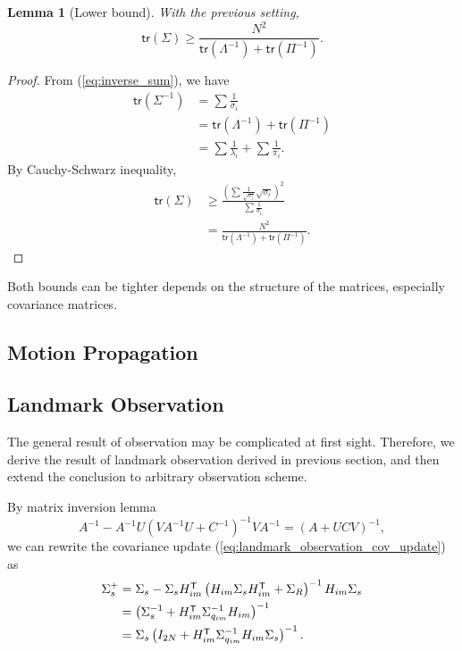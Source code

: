\documentclass[xcolor=x11names]{article}
\DeclareMathOperator\T{\mathsf{T}}
\newtheorem{lemma}{Lemma}
\begin{document}
   \begin{lemma}[Lower bound]
   With the previous setting, 
   \begin{equation}
      \mathsf{tr}(\Sigma) \geq \frac{N^2}{\mathsf{tr}(\Lambda^{-1})  +\mathsf{tr}(\Pi^{-1}) }.
   \end{equation}
   \end{lemma}
   \begin{proof}
   From (\ref{eq:inverse_sum}), we have
   \begin{align*}
       \mathsf{tr}(\Sigma^{-1})
         &=  \sum\frac{1}{\sigma_i}\\
         &= \mathsf{tr}(\Lambda^{-1}) + \mathsf{tr}(\Pi^{-1})  \\ 
         &= \sum\frac{1}{\lambda_i} + \sum\frac{1}{\pi_i}.
   \end{align*}
   By Cauchy-Schwarz inequality, 
   \begin{align*}
       \mathsf{tr}(\Sigma)
         &\geq \frac{\left( \sum \frac{1}{\sqrt{\sigma_i}}\sqrt{\sigma_i} \right)^2}{ \sum \frac{1}{\sigma_i}} \\
         &= \frac{N^2}{\mathsf{tr}(\Lambda^{-1})  +\mathsf{tr}(\Pi^{-1}) }.
   \end{align*}
   \end{proof}
   

   Both bounds can be tighter depends on the structure of the matrices, especially covariance matrices.


\subsection{Motion Propagation}


\subsection{Landmark Observation}
   The general result of observation may be complicated at first sight. Therefore, we derive the result of landmark observation derived in previous section, and then extend the conclusion to arbitrary observation scheme.

   By matrix inversion lemma
   \[
      A^{-1} - A^{-1} U \left(V A^{-1} U + C^{-1} \right)^{-1} V A^{-1} = \left(A + UC V \right)^{-1},
   \]
   we can rewrite the covariance update (\ref{eq:landmark_observation_cov_update}) as
   \begin{align}
      \Sigma^{+}_s &= \Sigma_s - \Sigma_s  H_{im}^{\T}  \left(  H_{im} \Sigma_{s}  H_{im}^{\T} +  \Sigma_R \right)^{-1} H_{im} \Sigma_s \notag\\
          &= \left( \Sigma_s^{-1} + H_{im}^{\T} \Sigma_{q_{im}}^{-1} H_{im}    \right)^{-1} \notag\\
          &= \Sigma_s \left( I_{2N} + H_{im}^{\T} \Sigma_{q_{im}}^{-1} H_{im} \Sigma_s   \right)^{-1}. 
          \label{eq:theoretical_landmark_observation}
   \end{align}    
    
\end{document}
